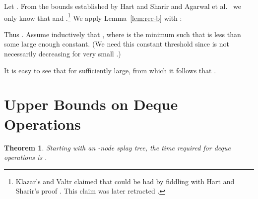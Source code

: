 \documentclass{article}
\newenvironment{proof}{\noindent {\bf Proof:}}{\hfill}
\newtheorem{theorem}{Theorem}[section]
\begin{document}
\begin{proof}
Let .  
From the bounds established by Hart and Sharir \cite{HS86}
and Agarwal et al.~\cite{ASS89} we only know that  and .\footnote{Klazar's 
and Valtr \cite{KV94} claimed that  could be had by fiddling with Hart and Sharir's proof \cite{HS86}.
This claim was later retracted \cite{Klazar02}.}
We apply Lemma~\ref{lem:rec-b} with
:


Thus .  Assume inductively that , where 
 is the minimum  such that  is less than some large enough constant.  (We need 
this constant threshold since  is not necessarily decreasing for very small .)


It is easy to see that  for  sufficiently large, from which it follows that
.
\end{proof}

\section{Upper Bounds on Deque Operations}\label{sect:deque}

\begin{theorem}
Starting with an -node splay tree, the time required for  deque operations
is .
\end{theorem}
\end{document}
